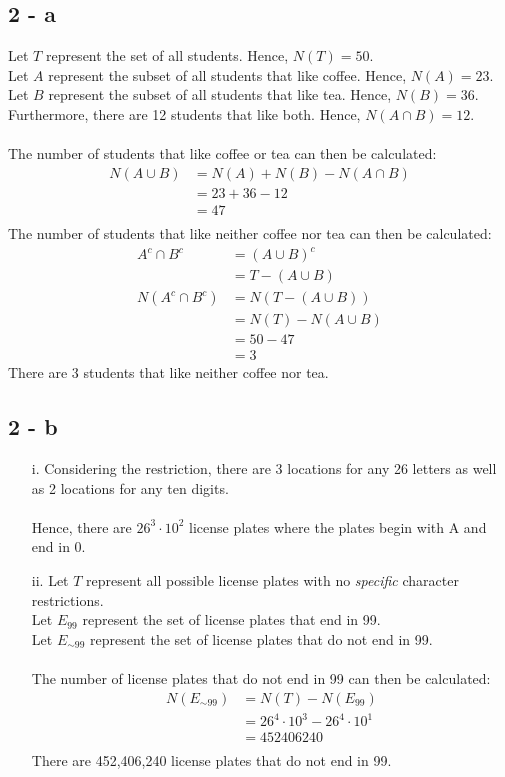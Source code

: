 \documentclass[12pt]{article}
\begin{document}
\subsection*{2 - a}
Let $T$ represent the set of all students. Hence, $N(T) = 50$. \\
Let $A$ represent the subset of all students that like coffee. Hence, $N(A) = 23$. \\ 
Let $B$ represent the subset of all students that like tea. Hence, $N(B) = 36$. \\
Furthermore, there are 12 students that like both. Hence, $N(A \cap B) = 12$.
\\ \\
The number of students that like coffee or tea can then be calculated: \\
\begin{align*}
  N(A \cup B) &= N(A) + N(B) - N(A \cap B) \\
  &= 23 + 36 - 12 \\ 
  &= 47 \\
\end{align*}
The number of students that like neither coffee nor tea can then be calculated: \\
\begin{align*}
  A^c \cap B^c &= (A \cup B)^c \\
  &= T - (A \cup B)\\
  N(A^c \cap B^c) &= N(T - (A \cup B)) \\
  &= N(T) - N(A \cup B) \\
  &= 50 - 47 \\
  &= 3
\end{align*}
There are 3 students that like neither coffee nor tea.
\subsection*{2 - b}
\begin{itemize}
  \item [i.] Considering the restriction, there are 3 locations for any 26 letters as well as 2 locations for any ten digits.
  \\ \\
  Hence, there are $26^3 \cdot 10^2$ license plates where the plates begin with A and end in 0.
  \item [ii.] Let $T$ represent all possible license plates with no \textit{specific} character restrictions. \\
  Let $E_{99}$ represent the set of license plates that end in 99. \\
  Let $E_{\sim99}$ represent the set of license plates that do not end in 99.
  \\ \\
  The number of license plates that do not end in 99 can then be calculated: \\
  \begin{align*}
    N(E_{\sim99}) &= N(T) - N(E_{99}) \\
    &= 26^4 \cdot 10^3 - 26^4 \cdot 10^1 \\
    &= 452406240 \\
  \end{align*}
  There are 452,406,240 license plates that do not end in 99.
\end{itemize}
\end{document}
